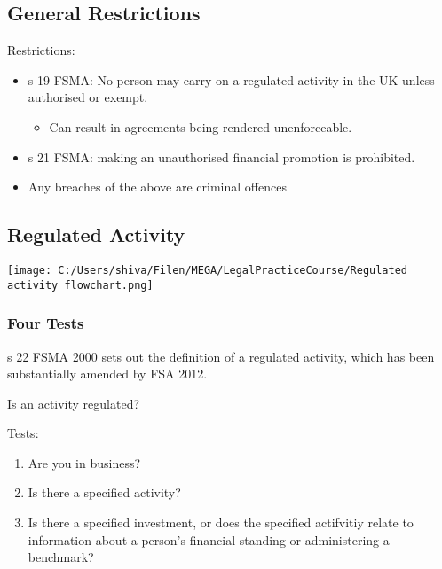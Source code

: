 \documentclass[
]{article}
\providecommand{\tightlist}{%
  \setlength{\itemsep}{0pt}\setlength{\parskip}{0pt}}
\newenvironment{env-9071ed6f-22c2-4fad-bdeb-265416ff35df}
{
    \savenotes\tcolorbox[blanker,breakable,left=5pt,borderline west={2pt}{-4pt}{pink}]
}
{
    \endtcolorbox\spewnotes
}
\begin{document}
\hypertarget{general-restrictions}{%
\subsection{General Restrictions}\label{general-restrictions}}

Restrictions:

\begin{itemize}
\tightlist
\item
  s 19 FSMA: No person may carry on a regulated activity in the UK
  unless authorised or exempt.

  \begin{itemize}
  \tightlist
  \item
    Can result in agreements being rendered unenforceable.
  \end{itemize}
\item
  s 21 FSMA: making an unauthorised financial promotion is prohibited.
\item
  Any breaches of the above are criminal offences
\end{itemize}

\hypertarget{regulated-activity}{%
\subsection{Regulated Activity}\label{regulated-activity}}

\texttt{[image: C:/Users/shiva/Filen/MEGA/LegalPracticeCourse/Regulated activity flowchart.png]}

\hypertarget{four-tests}{%
\subsubsection{Four Tests}\label{four-tests}}

s 22 FSMA 2000 sets out the definition of a regulated activity, which
has been substantially amended by FSA 2012.

\begin{env-9071ed6f-22c2-4fad-bdeb-265416ff35df}

Is an activity regulated?

Tests:

\begin{enumerate}
\tightlist
\item
  Are you in business?
\item
  Is there a specified activity?
\item
  Is there a specified investment, or does the specified actifvitiy
  relate to information about a person's financial standing or
  administering a benchmark?
\end{enumerate}

\end{env-9071ed6f-22c2-4fad-bdeb-265416ff35df}
\end{document}
